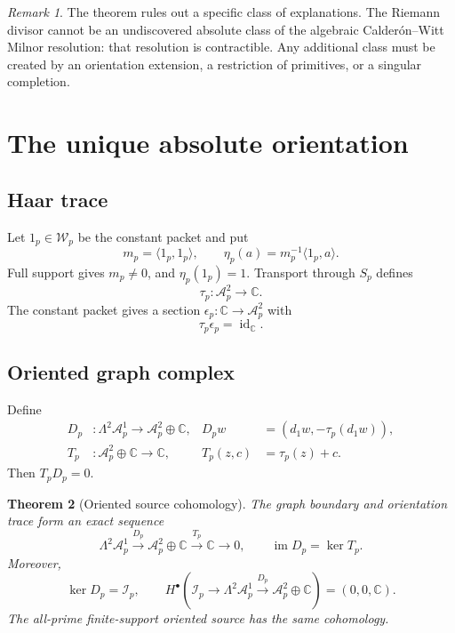 \documentclass[11pt]{article}
\newtheorem{theorem}{Theorem}[section]
\theoremstyle{definition}
\theoremstyle{remark}
\newtheorem{remark}[theorem]{Remark}
\newcommand{\C}{\mathbb C}
\newcommand{\cA}{\mathcal A}
\newcommand{\cI}{\mathcal I}
\newcommand{\cW}{\mathcal W}
\newcommand{\im}{\operatorname{im}}
\newcommand{\id}{\operatorname{id}}
\begin{document}
\begin{remark}
\label{rem:not-hidden-cohomology}
The theorem rules out a specific class of explanations.  The Riemann
divisor cannot be an undiscovered absolute class of the algebraic
Calder\'on--Witt Milnor resolution: that resolution is contractible.
Any additional class must be created by an orientation extension, a
restriction of primitives, or a singular completion.
\end{remark}

\section{The unique absolute orientation}
\label{sec:orientation}

\subsection{Haar trace}

Let \(1_p\in\cW_p\) be the constant packet and put
\[
  m_p=\langle1_p,1_p\rangle,\qquad
  \eta_p(a)=m_p^{-1}\langle1_p,a\rangle.
\tag{4.1}\label{eq:packet-trace}
\]
Full support gives \(m_p\ne0\), and \(\eta_p(1_p)=1\).  Transport through
\(S_p\) defines
\[
                     \tau_p:\cA_p^2\longrightarrow\C.
\tag{4.2}\label{eq:center-trace}
\]
The constant packet gives a section
\(\epsilon_p:\C\to\cA_p^2\) with
\[
                           \tau_p\epsilon_p=\id_\C.
\tag{4.3}\label{eq:trace-section}
\]

\subsection{Oriented graph complex}

Define
\[
\begin{aligned}
 D_p &: \Lambda^2\cA_p^1\longrightarrow\cA_p^2\oplus\C,
 &D_p w&=(d_1w,-\tau_p(d_1w)),\\
 T_p &: \cA_p^2\oplus\C\longrightarrow\C,
 &T_p(z,c)&=\tau_p(z)+c.
\end{aligned}
\tag{4.4}\label{eq:oriented-graph}
\]
Then \(T_pD_p=0\).

\begin{theorem}[Oriented source cohomology]
\label{thm:oriented-cohomology}
The graph boundary and orientation trace form an exact sequence
\[
 \Lambda^2\cA_p^1\xrightarrow{D_p}
 \cA_p^2\oplus\C\xrightarrow{T_p}\C\longrightarrow0,
\qquad
 \im D_p=\ker T_p.
\tag{4.5}\label{eq:oriented-exact}
\]
Moreover,
\[
 \ker D_p=\cI_p,\qquad
 H^\bullet\!\left(
  \cI_p\to\Lambda^2\cA_p^1\xrightarrow{D_p}
  \cA_p^2\oplus\C\right)=(0,0,\C).
\tag{4.6}\label{eq:oriented-cohomology}
\]
The all-prime finite-support oriented source has the same cohomology.
\end{theorem}
\end{document}
